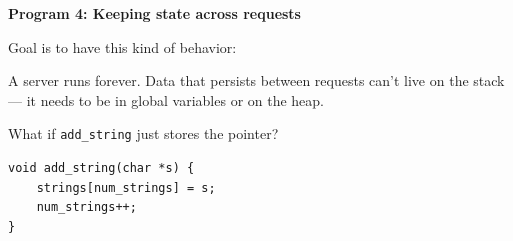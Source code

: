 \documentclass[oneside, landscape]{article}
\begin{document}
\newpage


\begin{minipage}[t]{0.40\textwidth}

\textbf{Program 4: Keeping state across requests}

Goal is to have this kind of behavior:



\vspace{0.5em}

A server runs forever. Data that persists between requests can't live on the
stack — it needs to be in global variables or on the heap.

\vspace{1em}

What if \texttt{add\_string} just stores the pointer?

\begin{lstlisting}[basicstyle=\ttfamily\footnotesize, numbers=none]
void add_string(char *s) {
    strings[num_strings] = s;
    num_strings++;
}
\end{lstlisting}



\end{minipage}
\hfill
\begin{minipage}[t]{0.55\textwidth}

%
\vspace{4\baselineskip}%
%
\vspace{2\baselineskip}%


\end{minipage}

\newpage


\normalsize
\end{document}
